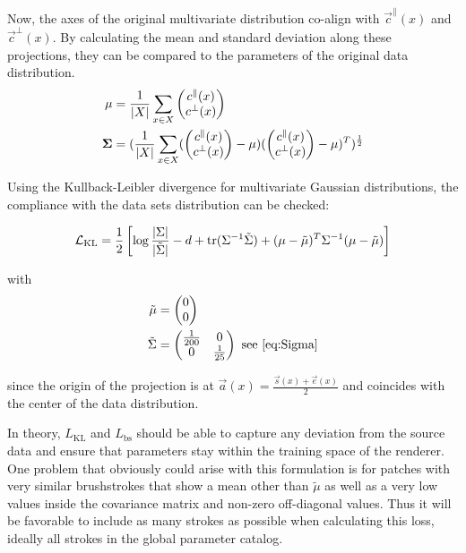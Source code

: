 Now, the axes of the original multivariate distribution co-align with $\vec{c}^\parallel(x)$ and $\vec{c}^\bot(x)$.
By calculating the mean and standard deviation along these projections, they can be compared to the parameters of the original data distribution.
\begin{align}
    \mathbf{\mu} & = \frac{1}{\vert X \vert}\sum_{x \in X} \begin{pmatrix} c^\parallel(x) \\ c^\bot(x) \end{pmatrix} \\
    \boldsymbol{\Sigma} & = (\frac{1}{\vert X \vert} \sum_{x \in X}
        (\begin{pmatrix} c^\parallel(x) \\ c^\bot(x) \end{pmatrix} - \mathbf{\mu})
        (\begin{pmatrix} c^\parallel(x) \\ c^\bot(x) \end{pmatrix} - \mathbf{\mu})^T
        )^{\frac{1}{2}} \\
\end{align}

Using the Kullback-Leibler divergence for multivariate Gaussian distributions, the compliance with the data sets distribution can be checked:

\begin{align}
    \mathcal{L}_{\text{KL}} = \frac{1}{2}\left[\log\frac{|\Sigma|}{|\tilde{\Sigma}|} - d + \text{tr} ( \Sigma^{-1}\tilde{\Sigma} ) + (\mu - \tilde{\mu})^T \Sigma^{-1}(\mu - \tilde{\mu})\right]
\end{align}

with 
\begin{align}
    \tilde{\mu} & = \begin{pmatrix} 0 \\ 0 \end{pmatrix} \\
    \tilde{\Sigma} & = \begin{pmatrix} \frac{1}{200} & 0 \\ 0 & \frac{1}{25} \end{pmatrix} \text{ see \eqref{eq:Sigma}}
\end{align}

since the origin of the projection is at $\vec{a}(x) = \frac{\vec{s}(x) + \vec{e}(x)}{2}$ and coincides with the center of the data distribution.

In theory, $L_{\text{KL}}$ and $L_{\text{bs}}$ should be able to capture any deviation from the source data and ensure that parameters stay within the training space of the renderer.
One problem that obviously could arise with this formulation is for patches with very similar brushstrokes that show a mean other than $\tilde{\mu}$ as well as a very low values inside the covariance matrix and non-zero off-diagonal values.
Thus it will be favorable to include as many strokes as possible when calculating this loss, ideally all strokes in the global parameter catalog.

